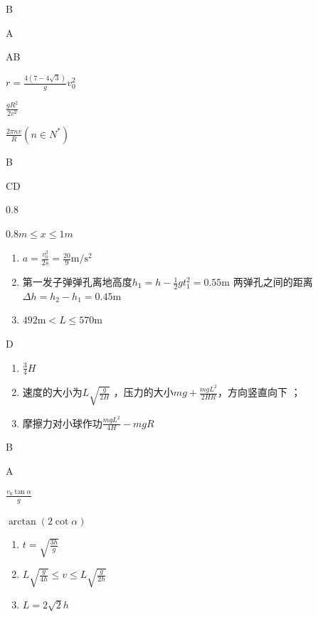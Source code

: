 \item B
\item A
\item AB
\item $r = \frac { 4 ( 7 - 4 \sqrt { 3 } ) } { g } v _ { 0 } ^ { 2 }$
\item $\frac { g R ^ { 2 } } { 2 v ^ { 2 } }$
\item $\frac { 2 \pi n v } { R } \left ( n \in N ^ { * } \right )$
\item B
\item CD
\item 0.8
\item $ 0.8m \leq x \leq 1m $
\item \begin {enumerate} \renewcommand {\labelenumi }{\arabic {enumi}.} \item $a = \frac { v _ { 0 } ^ { 2 } } { 2 s } = \frac { 20 } { 9 } \mathrm { m } / \mathrm { s } ^ { 2 }$ \par \item 第一发子弹弹孔离地高度$h _ { 1 } = h - \frac { 1 } { 2 } g t _ { 1 } ^ { 2 } = 0.55 \mathrm { m }$ \qquad 两弹孔之间的距离$\Delta h = h _ { 2 } - h _ { 1 } = 0.45 \mathrm { m }$ \item $492 \mathrm { m } < L \leq 570 \mathrm { m }$ \par \end {enumerate} \par \par 
\item D
\item \begin {enumerate} \renewcommand {\labelenumi }{\arabic {enumi}.} \item $ \frac { 3 }{ 4 } H $ \item 速度的大小为$L \sqrt { \frac { g } { 2 H } }$ ，压力的大小$m g + \frac { m g L ^ { 2 } } { 2 H R }$，方向竖直向下 ； \item 摩擦力对小球作功$\frac { m g L ^ { 2 } } { 4 H } - m g R$ \par \end {enumerate} \par \par 
\item B
\item A
\item $\frac { v _ { 0 } \tan \alpha } { g }$
\item $\arctan ( 2 \cot \alpha )$
\item \begin {enumerate} \renewcommand {\labelenumi }{\arabic {enumi}.} \item $t = \sqrt { \frac { 3 h } { g } }$ \item $L \sqrt { \frac { g } { 4 h } } \leq v \leq L \sqrt { \frac { g } { 2 h } }$ \item $L = 2 \sqrt { 2 } h$ \par \par \par \end {enumerate} \par \par 
